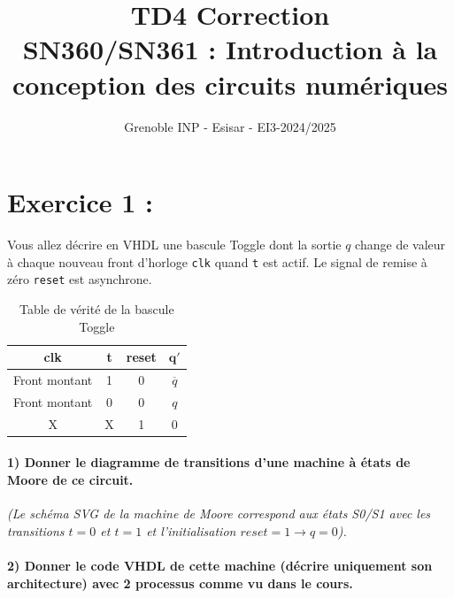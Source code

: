 \documentclass[11pt,a4paper]{article}
\title{TD4 Correction \\ \large SN360/SN361 : Introduction à la conception des circuits numériques}
\author{Grenoble INP - Esisar - EI3-2024/2025}
\date{}
\begin{document}
\maketitle

\section*{Exercice 1 :}

Vous allez décrire en VHDL une bascule Toggle dont la sortie $q$ change de valeur à chaque nouveau front d'horloge \texttt{clk} quand \texttt{t} est actif. Le signal de remise à zéro \texttt{reset} est asynchrone.

\begin{table}[h!]
    \centering
    \begin{tabular}{|c|c|c|c|}
        \hline
        \textbf{clk} & \textbf{t} & \textbf{reset} & $\mathbf{q'}$ \\ \hline
        Front montant & 1 & 0 & $\overline{q}$ \\ \hline
        Front montant & 0 & 0 & $q$ \\ \hline
        X & X & 1 & 0 \\ \hline
    \end{tabular}
    \caption{Table de vérité de la bascule Toggle}
\end{table}

\paragraph{1) Donner le diagramme de transitions d'une machine à états de Moore de ce circuit.}
\textit{(Le schéma SVG de la machine de Moore correspond aux états S0/S1 avec les transitions $t=0$ et $t=1$ et l'initialisation $reset=1 \rightarrow q=0$).}

\paragraph{2) Donner le code VHDL de cette machine (décrire uniquement son architecture) avec 2 processus comme vu dans le cours.}
\end{document}
